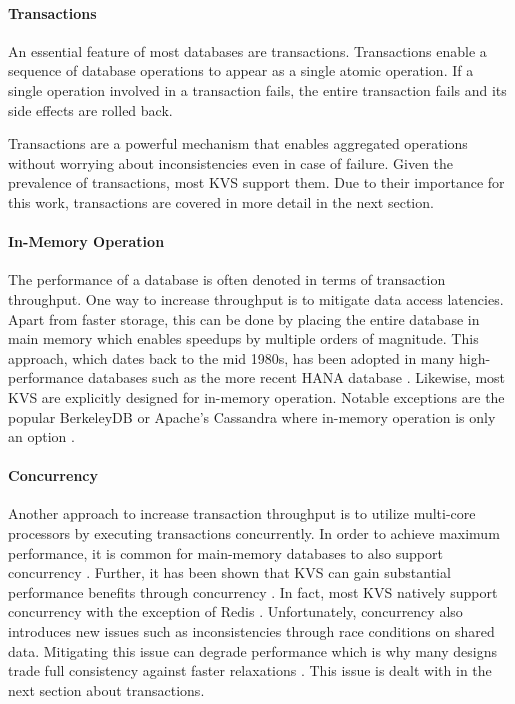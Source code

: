 \paragraph{Transactions}

An essential feature of most databases are transactions. Transactions enable a
sequence of database operations to appear as a single atomic operation. If a
single operation involved in a transaction fails, the entire transaction fails
and its side effects are rolled back.

Transactions are a powerful mechanism that enables aggregated operations without
worrying about inconsistencies even in case of failure. Given the prevalence of
transactions, most \ac{KVS} support them. Due to their importance for this work,
transactions are covered in more detail in the next section.


\paragraph{In-Memory Operation}

The performance of a database is often denoted in terms of transaction
throughput. One way to increase throughput is to mitigate data access latencies.
Apart from faster storage, this can be done by placing the entire database in
main memory which enables speedups by multiple orders of magnitude. This
approach, which dates back to the mid 1980s, has been adopted in many
high-performance databases such as the more recent HANA database
\cite{molina1992main, faerber2012hana}. Likewise, most \ac{KVS} are explicitly
designed for in-memory operation. Notable exceptions are the popular BerkeleyDB
or Apache's Cassandra where in-memory operation is only an option
\cite{bdb2017doc, lakshman2010cassandra}.

\paragraph{Concurrency}

Another approach to increase transaction throughput is to utilize multi-core
processors by executing transactions concurrently. In order to achieve maximum
performance, it is common for main-memory databases to also support concurrency
\cite{grund2010hyrise, faerber2012hana, diaconu2013hekaton}. Further, it has
been shown that \ac{KVS} can gain substantial performance benefits through
concurrency \cite{fan2013memc3, li2015architecting, xu2014building}. In fact,
most \ac{KVS} natively support concurrency with the exception of Redis
\cite{redis2017home}. Unfortunately, concurrency also introduces new issues such
as inconsistencies through race conditions on shared data. Mitigating this issue
can degrade performance which is why many designs trade full consistency against
faster relaxations \cite{decandia2007dynamo}. This issue is dealt with in the
next section about transactions.

